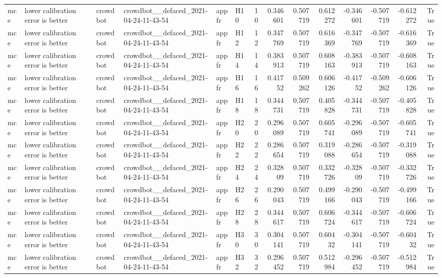 \begin{longtable}{llllllrrrrrrrr}
mce & lower calibration error is better & crowdbot & crowdbot\_\_defaced\_2021-04-24-11-43-54 & appfr & H10 & 10 & 0.346601 & 0.507719 & 0.612272 & -0.346601 & -0.507719 & -0.612272 & True \\
mce & lower calibration error is better & crowdbot & crowdbot\_\_defaced\_2021-04-24-11-43-54 & appfr & H12 & 12 & 0.347769 & 0.507719 & 0.616369 & -0.347769 & -0.507719 & -0.616369 & True \\
mce & lower calibration error is better & crowdbot & crowdbot\_\_defaced\_2021-04-24-11-43-54 & appfr & H14 & 14 & 0.383913 & 0.507719 & 0.608163 & -0.383913 & -0.507719 & -0.608163 & True \\
mce & lower calibration error is better & crowdbot & crowdbot\_\_defaced\_2021-04-24-11-43-54 & appfr & H16 & 16 & 0.41752 & 0.509262 & 0.606126 & -0.41752 & -0.509262 & -0.606126 & True \\
mce & lower calibration error is better & crowdbot & crowdbot\_\_defaced\_2021-04-24-11-43-54 & appfr & H18 & 18 & 0.344731 & 0.507719 & 0.405828 & -0.344731 & -0.507719 & -0.405828 & True \\
mce & lower calibration error is better & crowdbot & crowdbot\_\_defaced\_2021-04-24-11-43-54 & appfr & H20 & 20 & 0.296089 & 0.507719 & 0.605741 & -0.296089 & -0.507719 & -0.605741 & True \\
mce & lower calibration error is better & crowdbot & crowdbot\_\_defaced\_2021-04-24-11-43-54 & appfr & H22 & 22 & 0.286654 & 0.507719 & 0.319088 & -0.286654 & -0.507719 & -0.319088 & True \\
mce & lower calibration error is better & crowdbot & crowdbot\_\_defaced\_2021-04-24-11-43-54 & appfr & H24 & 24 & 0.32809 & 0.507719 & 0.332726 & -0.32809 & -0.507719 & -0.332726 & True \\
mce & lower calibration error is better & crowdbot & crowdbot\_\_defaced\_2021-04-24-11-43-54 & appfr & H26 & 26 & 0.290043 & 0.507719 & 0.499166 & -0.290043 & -0.507719 & -0.499166 & True \\
mce & lower calibration error is better & crowdbot & crowdbot\_\_defaced\_2021-04-24-11-43-54 & appfr & H28 & 28 & 0.344617 & 0.507719 & 0.606724 & -0.344617 & -0.507719 & -0.606724 & True \\
mce & lower calibration error is better & crowdbot & crowdbot\_\_defaced\_2021-04-24-11-43-54 & appfr & H30 & 30 & 0.304141 & 0.507719 & 0.60432 & -0.304141 & -0.507719 & -0.60432 & True \\
mce & lower calibration error is better & crowdbot & crowdbot\_\_defaced\_2021-04-24-11-43-54 & appfr & H32 & 32 & 0.296452 & 0.507719 & 0.512984 & -0.296452 & -0.507719 & -0.512984 & True \\

\end{longtable}
